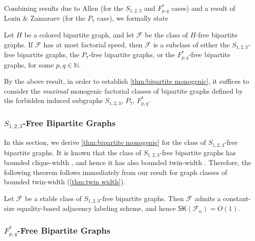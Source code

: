 \documentclass{theoretics}
\newcommand{\cF}{\ensuremath{\mathcal{F}}}
\newcommand{\RL}{\mathsf{SK}}
\begin{document}
Combining results due to Allen \cite{All09} (for the $S_{1,2,3}$ and $F^*_{p,q}$ cases) and a result of Lozin \& Zamaraev \cite{LZ17} (for the $P_7$ case), we formally state
\begin{theorem}
\label{lem:mongenic-factorial-excludes-P7-S123-Fpq}
Let $H$ be a colored bipartite graph, and let 
$\cF$ be the class of $H$-free bipartite graphs.
If $\cF$ has at most factorial speed, then $\cF$ is a subclass of either the $S_{1,2,3}$-free
bipartite graphs, the $P_7$-free bipartite graphs, or the $F^*_{p,q}$-free bipartite graphs, for some $p,q \in \mathbb{N}$.
\end{theorem}

By the above result, in order to establish \cref{thm:bipartite monogenic}, it suffices to consider
the \emph{maximal} monogenic factorial classes of bipartite graphs defined by the forbidden induced
subgraphs $S_{1,2,3}$, $P_7$, $F_{p,q}^*$.

\subsubsection{\texorpdfstring{$S_{1,2,3}$}{S 1,2,3}-Free Bipartite Graphs}

In this section, we derive \cref{thm:bipartite monogenic} for the class of $S_{1,2,3}$-free bipartite graphs.
It is known that the class of $S_{1,2,3}$-free bipartite graphs has bounded clique-width \cite{LV08},
and hence it has also bounded twin-width \cite{BKTW20}. Therefore, the following theorem
follows immediately from our result for graph classes of bounded twin-width (\cref{thm:twin width}). 

\begin{theorem}
	\label{th:S123 labeling}
	Let $\cF$ be a stable class of $S_{1,2,3}$-free bipartite graphs.
	Then $\cF$ admits a constant-size equality-based adjacency labeling scheme, and hence $\RL(\cF_n) = O(1)$.
\end{theorem}




\subsubsection{\texorpdfstring{$F^*_{p,q}$}{F p,q}-Free Bipartite Graphs}
\label{sec:Fpq}
\end{document}
